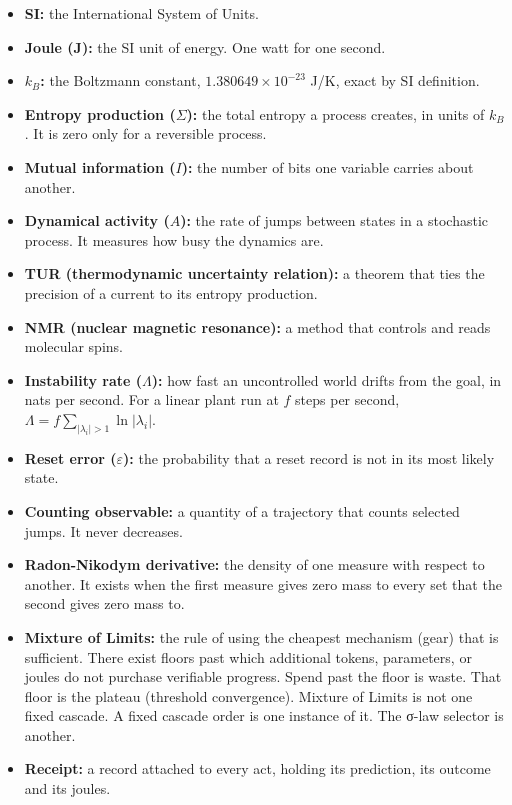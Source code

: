 \documentclass[
  10pt,
]{article}
\providecommand{\tightlist}{%
  \setlength{\itemsep}{0pt}\setlength{\parskip}{0pt}}
\begin{document}
\begin{itemize}
\tightlist
\item
  \textbf{SI:} the International System of Units.
\item
  \textbf{Joule (J):} the SI unit of energy. One watt for one second.
\item
  \textbf{\(k_B\):} the Boltzmann constant, \(1.380649 \times 10^{-23}\)
  J/K, exact by SI definition.
\item
  \textbf{Entropy production (\(\Sigma\)):} the total entropy a process
  creates, in units of \(k_B\). It is zero only for a reversible
  process.
\item
  \textbf{Mutual information (\(I\)):} the number of bits one variable
  carries about another.
\item
  \textbf{Dynamical activity (\(A\)):} the rate of jumps between states
  in a stochastic process. It measures how busy the dynamics are.
\item
  \textbf{TUR (thermodynamic uncertainty relation):} a theorem that ties
  the precision of a current to its entropy production.
\item
  \textbf{NMR (nuclear magnetic resonance):} a method that controls and
  reads molecular spins.
\item
  \textbf{Instability rate (\(\Lambda\)):} how fast an uncontrolled
  world drifts from the goal, in nats per second. For a linear plant run
  at \(f\) steps per second,
  \(\Lambda = f\sum_{|\lambda_i|>1}\ln|\lambda_i|\).
\item
  \textbf{Reset error (\(\varepsilon\)):} the probability that a reset
  record is not in its most likely state.
\item
  \textbf{Counting observable:} a quantity of a trajectory that counts
  selected jumps. It never decreases.
\item
  \textbf{Radon-Nikodym derivative:} the density of one measure with
  respect to another. It exists when the first measure gives zero mass
  to every set that the second gives zero mass to.
\item
  \textbf{Mixture of Limits:} the rule of using the cheapest mechanism
  (gear) that is sufficient. There exist floors past which additional
  tokens, parameters, or joules do not purchase verifiable progress.
  Spend past the floor is waste. That floor is the plateau (threshold
  convergence). Mixture of Limits is not one fixed cascade. A fixed
  cascade order is one instance of it. The σ-law selector is another.
\item
  \textbf{Receipt:} a record attached to every act, holding its
  prediction, its outcome and its joules.
\end{itemize}
\end{document}
